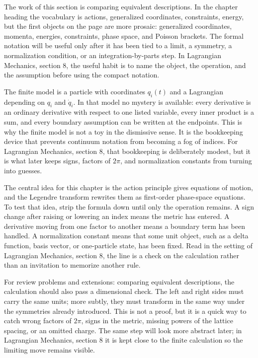 The work of this section is comparing equivalent descriptions.  In the chapter heading the vocabulary is actions, generalized coordinates, constraints, energy, but the first objects on the page are more prosaic: generalized coordinates, momenta, energies, constraints, phase space, and Poisson brackets.  The formal notation will be useful only after it has been tied to a limit, a symmetry, a normalization condition, or an integration-by-parts step.  In Lagrangian Mechanics, section 8, the useful habit is to name the object, the operation, and the assumption before using the compact notation.

The finite model is a particle with coordinates \(q_i(t)\) and a Lagrangian depending on \(q_i\) and \(\dot q_i\).  In that model no mystery is available: every derivative is an ordinary derivative with respect to one listed variable, every inner product is a sum, and every boundary assumption can be written at the endpoints.  This is why the finite model is not a toy in the dismissive sense.  It is the bookkeeping device that prevents continuum notation from becoming a fog of indices.  For Lagrangian Mechanics, section 8, that bookkeeping is deliberately modest, but it is what later keeps signs, factors of \(2\pi\), and normalization constants from turning into guesses.

The central idea for this chapter is the action principle gives equations of motion, and the Legendre transform rewrites them as first-order phase-space equations.  To test that idea, strip the formula down until only the operation remains.  A sign change after raising or lowering an index means the metric has entered.  A derivative moving from one factor to another means a boundary term has been handled.  A normalization constant means that some unit object, such as a delta function, basis vector, or one-particle state, has been fixed.  Read in the setting of Lagrangian Mechanics, section 8, the line is a check on the calculation rather than an invitation to memorize another rule.

For review problems and extensions: comparing equivalent descriptions, the calculation should also pass a dimensional check.  The left and right sides must carry the same units; more subtly, they must transform in the same way under the symmetries already introduced.  This is not a proof, but it is a quick way to catch wrong factors of \(2\pi\), signs in the metric, missing powers of the lattice spacing, or an omitted charge.  The same step will look more abstract later; in Lagrangian Mechanics, section 8 it is kept close to the finite calculation so the limiting move remains visible.

